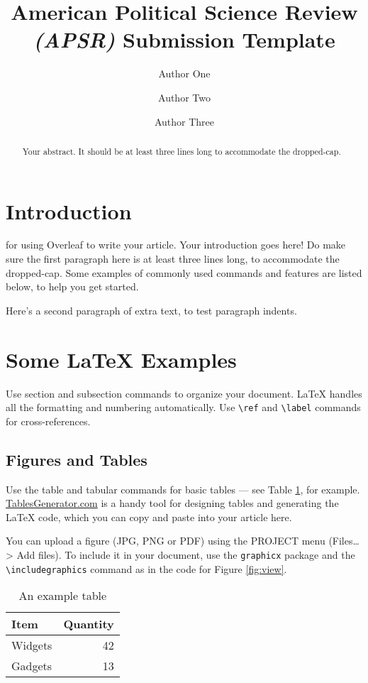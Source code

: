 \documentclass[bibtex,autowc]{apsr_submission}
\title{American Political Science Review \emph{(APSR)} Submission Template}
\author{Author One}
       {Affiliation A}
       {Author One is PhD Candidate, ABC Department, Affiliation A, 12345 NY. (a.1@example.edu)}
\author{Author Two}
       {Affiliation C}
       {Author Two is Assistant Professor, Faculty of Z, Affiliation B, 42813. Corresponding Author (a.2@acme.edu) Additional notes about Author Two.}
\author{Author Three}
       {Affiliation B}
       {Author Three is ...}
\begin{document}
\begin{frontmatter}
\begin{abstract}
Your abstract. It should be at least three lines long to accommodate the dropped-cap. \lipsum[1]
\end{abstract}
\end{frontmatter}

\section{Introduction}

 for using Overleaf to write your article. Your introduction goes here! Do make sure the first paragraph here is at least three lines long, to accommodate the dropped-cap. Some examples of commonly used commands and features are listed below, to help you get started.

Here's a second paragraph of extra text, to test paragraph indents.

\section{Some \LaTeX{} Examples}
\label{sec:examples}

Use section and subsection commands to organize your document. \LaTeX{} handles all the formatting and numbering automatically. Use \verb|\ref| and \verb|\label| commands for cross-references.

\subsection{Figures and Tables}

Use the table and tabular commands for basic tables --- see Table \ref{tab:widgets}, for example. \href{http://tablesgenerator.com}{TablesGenerator.com} is a handy tool for designing tables and generating the  LaTeX code, which you can copy and paste into your article here.

You can upload a figure (JPG, PNG or PDF) using the PROJECT menu (Files\ldots > Add files). To include it in your document, use the \verb|graphicx| package and the \verb|\includegraphics| command as in the code for Figure \ref{fig:view}. 

\begin{table}[hbt!]
\caption{An example table}
\label{tab:widgets}
\centering
\begin{tabular}{lr}
Item & Quantity \\\midrule
Widgets & 42 \\
Gadgets & 13
\end{tabular}
\end{table}
\end{document}
